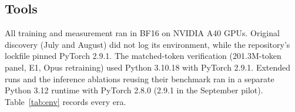\documentclass{article}
\newif\ifshowhumanmarkers \showhumanmarkersfalse
\newcommand{\humantag}[1]{{\color{humanframe}\sffamily\scriptsize\bfseries HUMAN AUTHOR MUST REWRITE/VERIFY [#1]}\ }
\newcommand{\humanauthor}[2][]{\ifshowhumanmarkers\begin{humanbox}\humantag{#1}#2\end{humanbox}\else #2\par\fi}
\begin{document}
\subsection{Tools}
\humanauthor[P2-03 r6]{ All training and measurement ran in BF16 on NVIDIA A40 GPUs. Original discovery (July and August) did not log its environment, while the repository's lockfile pinned PyTorch 2.9.1. The matched-token verification (201.3M-token panel, E1, Opus retraining) used Python 3.10.18 with PyTorch 2.9.1. Extended runs and the inference ablations reusing their benchmark ran in a separate Python 3.12 runtime with PyTorch 2.8.0 (2.9.1 in the September pilot). Table~\ref{tab:env} records every era.}
\end{document}
